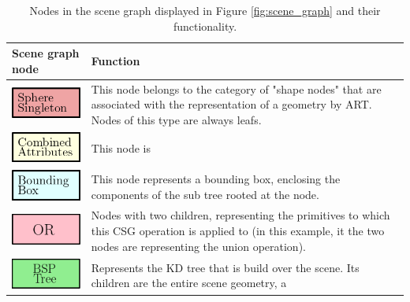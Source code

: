 \begin{table}
	\centering
	{%
		\begin{tabular}{p{0.2\linewidth} p{0.8\linewidth}}
			\toprule
			Scene graph node & Function  \\
			\midrule
			\includegraphics[scale=0.5]{img/2 art/shape_node.png} & This node belongs to the category of "shape nodes" that are associated with the representation of a geometry by ART. Nodes of this type are always leafs.\\
			\includegraphics[scale=0.5]{img/2 art/comb_attr_node.png} & This node is \\
			\includegraphics[scale=0.5, valign=c]{img/2 art/bounding_box.png} & This node represents a bounding box, enclosing the components of the sub tree rooted at the node. \\
			\includegraphics[scale=0.5]{img/2 art/or.png} & Nodes with two children, representing the primitives to which this CSG operation is applied to (in this example, it the two nodes are representing the union operation). \\
			\includegraphics[scale=0.5]{img/2 art/bsp_node.png} & Represents the KD tree that is build over the scene. Its children are the entire scene geometry, a  \\
			\bottomrule
	\end{tabular}}
	\caption{Nodes in the scene graph displayed in Figure \ref{fig:scene_graph} and their functionality.}
	\label{tab:nodes}
\end{table}


